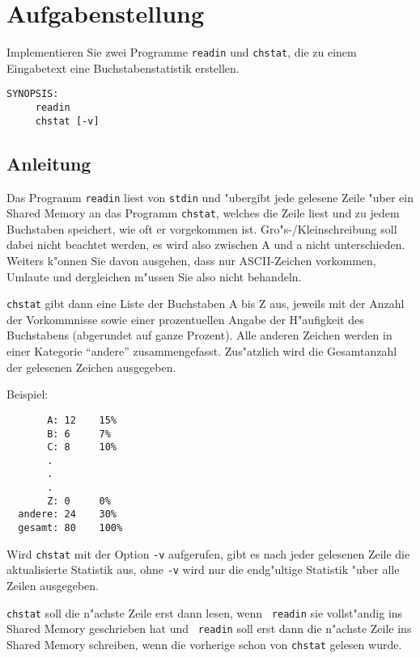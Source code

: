 




\section*{Aufgabenstellung}

Implementieren Sie zwei Programme {\tt readin} und {\tt chstat}, die
zu einem Eingabetext eine Buchstabenstatistik erstellen.

\begin{verbatim}
SYNOPSIS:
     readin
     chstat [-v]
\end{verbatim} 




\subsection*{Anleitung}

Das Programm {\tt readin} liest von {\tt stdin} und "ubergibt jede
gelesene Zeile "uber ein Shared Memory an das Programm {\tt chstat},
welches die Zeile liest und zu jedem Buchstaben speichert, wie oft er
vorgekommen ist. Gro"s-/Kleinschreibung soll dabei nicht beachtet
werden, es wird also zwischen A und a nicht unterschieden. Weiters
k"onnen Sie davon ausgehen, dass nur ASCII-Zeichen vorkommen, Umlaute
und dergleichen m"ussen Sie also nicht behandeln.

{\tt chstat} gibt dann eine Liste der Buchstaben A bis Z aus, jeweils
mit der Anzahl der Vorkommnisse sowie einer prozentuellen Angabe der
H"aufigkeit des Buchstabens (abgerundet auf ganze Prozent). Alle
anderen Zeichen werden in einer Kategorie ``andere''
zusammengefasst. Zus"atzlich wird die Gesamtanzahl der gelesenen
Zeichen ausgegeben.

Beispiel:
\begin{verbatim}
       A: 12    15%
       B: 6     7%
       C: 8     10%
       .
       .
       .
       Z: 0     0%
  andere: 24    30%
  gesamt: 80    100%
\end{verbatim}

Wird {\tt chstat} mit der Option {\tt -v} aufgerufen, gibt es nach
jeder gelesenen Zeile die aktualisierte Statistik aus, ohne {\tt -v}
wird nur die endg"ultige Statistik "uber alle Zeilen ausgegeben.

{\tt chstat} soll die n"achste Zeile erst dann lesen, wenn {\tt
readin} sie vollst"andig ins Shared Memory geschrieben hat und {\tt
readin} soll erst dann die n"achste Zeile ins Shared Memory schreiben,
wenn die vorherige schon von {\tt chstat} gelesen wurde.

